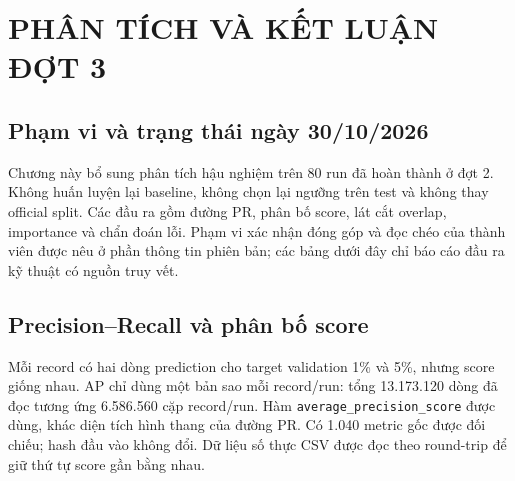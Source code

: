 
\chapter{PHÂN TÍCH VÀ KẾT LUẬN ĐỢT 3}
\label{chap:dot3}
\section{Phạm vi và trạng thái ngày 30/10/2026}
Chương này bổ sung phân tích hậu nghiệm trên 80 run đã hoàn thành ở đợt 2. Không huấn luyện lại baseline, không chọn lại ngưỡng trên test và không thay official split. Các đầu ra gồm đường PR, phân bố score, lát cắt overlap, importance và chẩn đoán lỗi. Phạm vi xác nhận đóng góp và đọc chéo của thành viên được nêu ở phần thông tin phiên bản; các bảng dưới đây chỉ báo cáo đầu ra kỹ thuật có nguồn truy vết.



\section{Precision--Recall và phân bố score}
Mỗi record có hai dòng prediction cho target validation 1\% và 5\%, nhưng score giống nhau. AP chỉ dùng một bản sao mỗi record/run: tổng 13.173.120 dòng đã đọc tương ứng 6.586.560 cặp record/run. Hàm \texttt{average\_precision\_score} được dùng, khác diện tích hình thang của đường PR. Có 1.040 metric gốc được đối chiếu; hash đầu vào không đổi. Dữ liệu số thực CSV được đọc theo round-trip để giữ thứ tự score gần bằng nhau.

